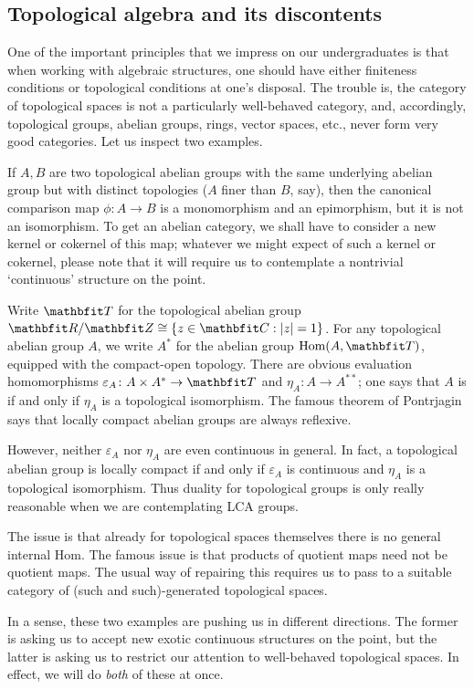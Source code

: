 \subsection*{Topological algebra and its discontents}

One of the important principles that we impress on our undergraduates is that when working with algebraic structures, one should have either finiteness conditions or topological conditions at one's disposal.
The trouble is, the category of topological spaces is not a particularly well-behaved category, and, accordingly, topological groups, abelian groups, rings, vector spaces, etc., never form very good categories.
Let us inspect two examples.

\begin{exm*}
	If $ A, B $ are two topological abelian groups with the same underlying abelian group but with distinct topologies ($ A $ finer than $ B $, say), then the canonical comparison map $ \phi \colon A \to B $ is a monomorphism and an epimorphism, but it is not an isomorphism.
	To get an abelian category, we shall have to consider a new kernel or cokernel of this map;
	whatever we might expect of such a kernel or cokernel, please note that it will require us to contemplate a nontrivial `continuous' structure on the point.
\end{exm*}

\begin{exm*}
	Write $ \TT $ for the topological abelian group $ \RR/\ZZ \cong \{ z \in \CC : |z| = 1 \} $.
	For any topological abelian group $ A $, we write $ A^{\ast} $ for the  abelian group $ \Hom(A, \TT) $, equipped with the compact-open topology.
	There are obvious evaluation homomorphisms $ \varepsilon_A \colon A \times A^{\ast} \to \TT $ and $ \eta_A \colon A \to A^{\ast\ast} $;
	one says that $ A $ is  if and only if $ \eta_A $ is a topological isomorphism.
	The famous theorem of Pontrjagin says that locally compact abelian groups are always reflexive.

	However, neither $ \varepsilon_A $ nor $ \eta_A $ are even continuous in general.
	In fact, a topological abelian group is locally compact if and only if $ \varepsilon_A $ is continuous and $ \eta_A $ is a topological isomorphism.
	Thus duality for topological groups is only really reasonable when we are contemplating LCA groups.

	The issue is that already for topological spaces themselves there is no general internal Hom.
	The famous issue is that products of quotient maps need not be quotient maps.
	The usual way of repairing this requires us to pass to a suitable category of (such and such)-generated topological spaces.
\end{exm*}

In a sense, these two examples are pushing us in different directions.
The former is asking us to accept new exotic continuous structures on the point, but the latter is asking us to restrict our attention to well-behaved topological spaces.
In effect, we will do \emph{both} of these at once.


